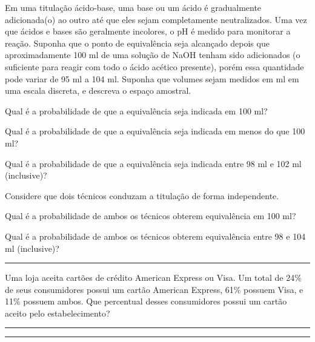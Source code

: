 \documentclass[a4paper,11pt,fleqn]{article}\usepackage[]{graphicx}\usepackage[]{color}
\theoremstyle{definition}
\begin{document}
\begin{compactenum}
\item Em uma titulação ácido-base, uma base ou um ácido é gradualmente
  adicionada(o) ao outro até que eles sejam completamente neutralizados.
  Uma vez que ácidos e bases são geralmente incolores, o pH é medido
  para monitorar a reação. Suponha que o ponto de equivalência seja
  alcançado depois que aproximadamente 100 ml de uma solução de NaOH
  tenham sido adicionados (o suficiente para reagir com todo o ácido
  acético presente), porém essa quantidade pode variar de 95 ml a 104
  ml. Suponha que volumes sejam medidos em ml em uma escala discreta, e
  descreva o espaço amostral.
  \begin{compactenum}
  \item Qual é a probabilidade de que a equivalência seja indicada em
    100 ml?
  \item Qual é a probabilidade de que a equivalência seja indicada em
    menos do que 100 ml?
  \item Qual é a probabilidade de que a equivalência seja indicada entre
    98 ml e 102 ml (inclusive)?
  \item Considere que dois técnicos conduzam a titulação de forma
    independente.
    \begin{compactenum}
    \item Qual é a probabilidade de ambos os técnicos obterem
      equivalência em 100 ml?
    \item Qual é a probabilidade de ambos os técnicos obterem
      equivalência entre 98 e 104 ml (inclusive)?
    \end{compactenum}
  \end{compactenum}

\vspace{0.3cm}
\hrule
\vspace{0.3cm}

\item Uma loja aceita cartões de crédito American Express ou Visa. Um
  total de 24\% de seus consumidores possui um cartão American Express,
  61\% possuem Visa, e 11\% possuem ambos. Que percentual desses
  consumidores possui um cartão aceito pelo estabelecimento?

\vspace{0.3cm}
\hrule
\vspace{0.3cm}

\clearpage

\vspace{0.3cm}
\hrule
\vspace{0.3cm}


\end{compactenum}
\end{document}
